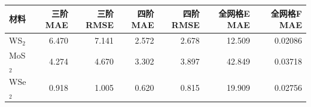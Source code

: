 \begin{tabular}{lrrrrrr}
\toprule
材料 & 三阶MAE & 三阶RMSE & 四阶MAE & 四阶RMSE & 全网格E MAE & 全网格F MAE \\
\midrule
WS$_2$ & 6.470 & 7.141 & 2.572 & 2.678 & 12.509 & 0.02086 \\
MoS$_2$ & 4.274 & 4.670 & 3.302 & 3.897 & 42.849 & 0.03718 \\
WSe$_2$ & 0.918 & 1.005 & 0.620 & 0.815 & 19.909 & 0.02756 \\
\bottomrule
\end{tabular}
